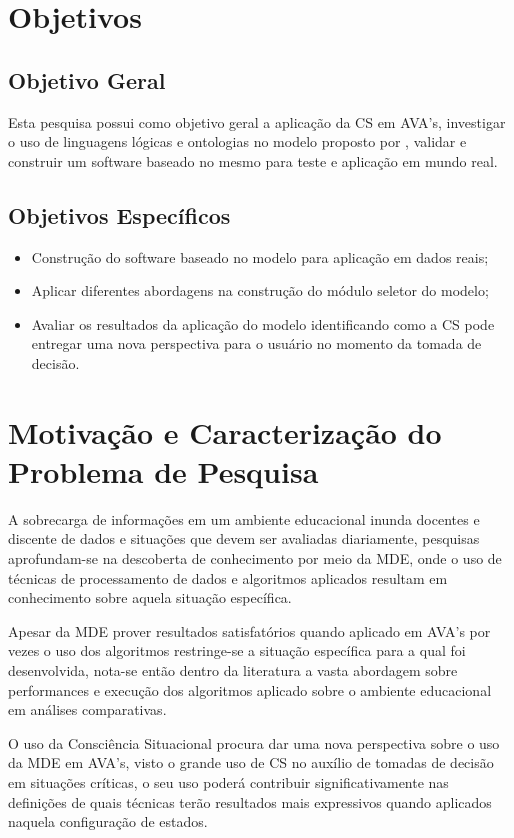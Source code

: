 \documentclass[
	oneside,
	12pt,				%
	a4paper,			%
	english,			%
	brazil,				%
	article
	]{abntex2}
\begin{document}
\section{Objetivos}

\subsection{Objetivo Geral}

Esta pesquisa possui como objetivo geral a aplicação da CS em AVA's, investigar o uso de linguagens lógicas  e ontologias no modelo proposto por , validar e construir um software baseado no mesmo para teste e aplicação em mundo real.

\subsection{Objetivos Específicos}

\begin{itemize}
	\item Construção do software baseado no modelo para aplicação em dados reais;
	\item Aplicar diferentes abordagens na construção do módulo seletor do modelo;
	\item Avaliar os resultados da aplicação do modelo identificando como a CS pode entregar uma nova perspectiva para o usuário no momento da tomada de decisão.  
\end{itemize}

\section{Motivação e Caracterização do Problema de Pesquisa}

A sobrecarga de informações em um ambiente educacional inunda docentes e discente de dados e situações que devem ser avaliadas diariamente, pesquisas aprofundam-se na descoberta de conhecimento por meio da MDE, onde o uso de técnicas de processamento de dados e algoritmos aplicados resultam em conhecimento sobre aquela situação específica.

Apesar da MDE prover resultados satisfatórios quando aplicado em AVA's por vezes o uso dos algoritmos restringe-se a situação específica para a qual foi desenvolvida, nota-se então dentro da literatura a vasta abordagem sobre performances e execução dos algoritmos aplicado sobre o ambiente educacional em análises comparativas. 

O uso da Consciência Situacional procura dar uma nova perspectiva sobre o uso da MDE em AVA's, visto o grande uso de CS no auxílio de tomadas de decisão em situações críticas, o seu uso poderá contribuir significativamente nas definições de quais técnicas terão resultados mais expressivos quando aplicados naquela configuração de estados.
\end{document}
